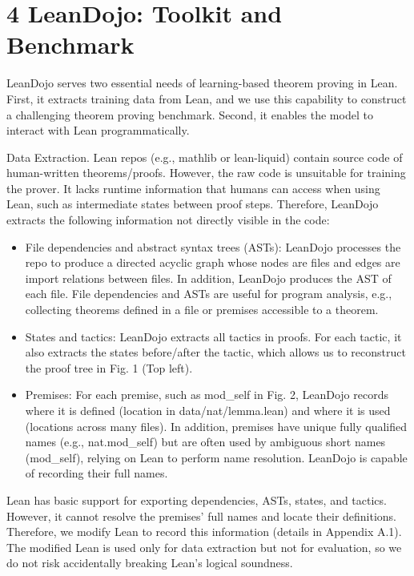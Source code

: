 \documentclass[
]{article}
\providecommand{\tightlist}{%
  \setlength{\itemsep}{0pt}\setlength{\parskip}{0pt}}
\begin{document}
\section{4 LeanDojo: Toolkit and
Benchmark}\label{leandojo-toolkit-and-benchmark}

LeanDojo serves two essential needs of learning-based theorem proving in
Lean. First, it extracts training data from Lean, and we use this
capability to construct a challenging theorem proving benchmark. Second,
it enables the model to interact with Lean programmatically.

Data Extraction. Lean repos (e.g., mathlib or lean-liquid) contain
source code of human-written theorems/proofs. However, the raw code is
unsuitable for training the prover. It lacks runtime information that
humans can access when using Lean, such as intermediate states between
proof steps. Therefore, LeanDojo extracts the following information not
directly visible in the code:

\begin{itemize}
\tightlist
\item
  File dependencies and abstract syntax trees (ASTs): LeanDojo processes
  the repo to produce a directed acyclic graph whose nodes are files and
  edges are import relations between files. In addition, LeanDojo
  produces the AST of each file. File dependencies and ASTs are useful
  for program analysis, e.g., collecting theorems defined in a file or
  premises accessible to a theorem.\\
\item
  States and tactics: LeanDojo extracts all tactics in proofs. For each
  tactic, it also extracts the states before/after the tactic, which
  allows us to reconstruct the proof tree in Fig. 1 (Top left).\\
\item
  Premises: For each premise, such as mod\_self in Fig. 2, LeanDojo
  records where it is defined (location in data/nat/lemma.lean) and
  where it is used (locations across many files). In addition, premises
  have unique fully qualified names (e.g., nat.mod\_self) but are often
  used by ambiguous short names (mod\_self), relying on Lean to perform
  name resolution. LeanDojo is capable of recording their full names.
\end{itemize}

Lean has basic support for exporting dependencies, ASTs, states, and
tactics. However, it cannot resolve the premises' full names and locate
their definitions. Therefore, we modify Lean to record this information
(details in Appendix A.1). The modified Lean is used only for data
extraction but not for evaluation, so we do not risk accidentally
breaking Lean's logical soundness.
\end{document}
